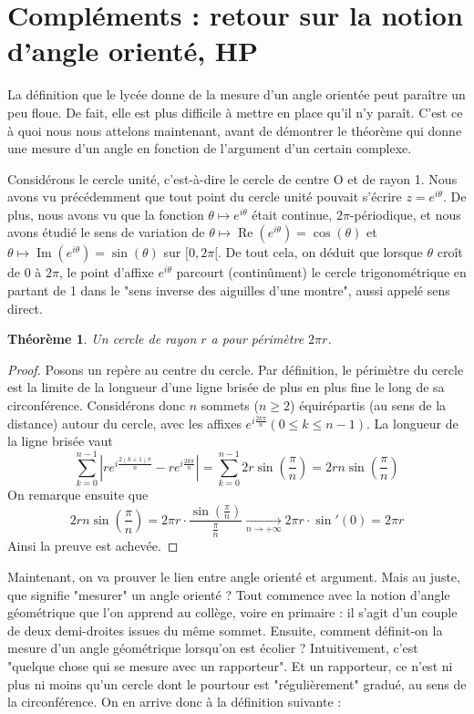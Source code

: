 \documentclass[french]{book}
\theoremstyle{plain}
\newtheorem{thm}{Théorème}[chapter]
\theoremstyle{definition}
\theoremstyle{remark}
\begin{document}
\section{Compléments : retour sur la notion d'angle orienté, HP}
La définition que le lycée donne de la mesure d'un angle orientée peut paraître un peu floue. De fait, elle est plus difficile à mettre en place qu'il n'y paraît. C'est ce à quoi nous nous attelons maintenant, avant de démontrer le théorème qui donne une mesure d'un angle en fonction de l'argument d'un certain complexe. \\ \par
Considérons le cercle unité, c'est-à-dire le cercle de centre O et de rayon 1. Nous avons vu précédemment que tout point du cercle unité pouvait s'écrire $z = e^{i\theta}$. De plus, nous avons vu que la fonction $\theta \mapsto e^{i\theta}$ était continue, $2\pi$-périodique, et nous avons étudié le sens de variation de $\theta \mapsto \operatorname{Re}(e^{i\theta}) = \cos(\theta)$ et $\theta \mapsto \operatorname{Im}(e^{i\theta}) = \sin(\theta)$ sur $[0, 2\pi[$. De tout cela, on déduit que lorsque $\theta$ croît de 0 à $2\pi$, le point d'affixe $e^{i\theta}$ parcourt (continûment) le cercle trigonométrique en partant de 1 dans le "sens inverse des aiguilles d'une montre", aussi appelé sens direct.

\begin{thm}
	Un cercle de rayon $r$ a pour périmètre $2\pi r$.
\end{thm}
\begin{proof}
	Posons un repère au centre du cercle. Par définition, le périmètre du cercle est la limite de la longueur d'une ligne brisée de plus en plus fine le long de sa circonférence. Considérons donc $n$ sommets ($n \geqslant 2$) équirépartis (au sens de la distance) autour du cercle, avec les affixes $e^{i\frac{2k\pi}{n}} (0 \leqslant k \leqslant n-1)$. La longueur de la ligne brisée vaut $$\sum_{k=0}^{n-1} \left| re^{i\frac{2(k+1)\pi}{n}} - re^{i\frac{2k\pi}{n}} \right| = \sum_{k=0}^{n-1} 2r \sin\left(\frac{\pi}{n}\right) = 2rn \sin\left(\frac{\pi}{n}\right)$$
	On remarque ensuite que $$2rn \sin\left(\frac{\pi}{n}\right) = 2\pi r \cdot \frac{\sin(\frac{\pi}{n})}{\frac{\pi}{n}} \xrightarrow[n \to +\infty]{} 2\pi r \cdot \sin'(0) = 2\pi r$$
Ainsi la preuve est achevée.
\end{proof}
Maintenant, on va prouver le lien entre angle orienté et argument. Mais au juste, que signifie "mesurer" un angle orienté ? Tout commence avec la notion d'angle géométrique que l'on apprend au collège, voire en primaire : il s'agit d'un couple de deux demi-droites issues du même sommet. Ensuite, comment définit-on la mesure d'un angle géométrique lorsqu'on est écolier ? Intuitivement, c'est "quelque chose qui se mesure avec un rapporteur". Et un rapporteur, ce n'est ni plus ni moins qu'un cercle dont le pourtour est "régulièrement" gradué, au sens de la circonférence. On en arrive donc à la définition suivante :
\end{document}
